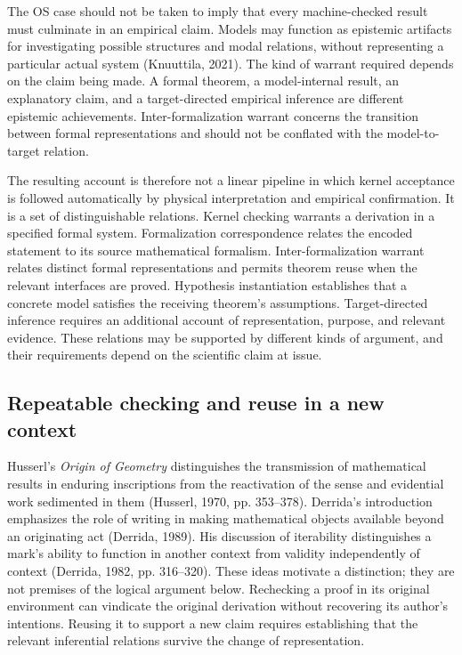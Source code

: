 \documentclass[pdflatex,sn-apa]{sn-jnl}
\begin{document}
The OS case should not be taken to imply that every machine-checked result must culminate in an empirical claim. Models may function as epistemic artifacts for investigating possible structures and modal relations, without representing a particular actual system (Knuuttila, 2021). The kind of warrant required depends on the claim being made. A formal theorem, a model-internal result, an explanatory claim, and a target-directed empirical inference are different epistemic achievements. Inter-formalization warrant concerns the transition between formal representations and should not be conflated with the model-to-target relation.

The resulting account is therefore not a linear pipeline in which kernel acceptance is followed automatically by physical interpretation and empirical confirmation. It is a set of distinguishable relations. Kernel checking warrants a derivation in a specified formal system. Formalization correspondence relates the encoded statement to its source mathematical formalism. Inter-formalization warrant relates distinct formal representations and permits theorem reuse when the relevant interfaces are proved. Hypothesis instantiation establishes that a concrete model satisfies the receiving theorem's assumptions. Target-directed inference requires an additional account of representation, purpose, and relevant evidence. These relations may be supported by different kinds of argument, and their requirements depend on the scientific claim at issue.

\subsection{Repeatable checking and reuse in a new context}

Husserl's \emph{Origin of Geometry} distinguishes the transmission of mathematical results in enduring inscriptions from the reactivation of the sense and evidential work sedimented in them (Husserl, 1970, pp. 353--378). Derrida's introduction emphasizes the role of writing in making mathematical objects available beyond an originating act (Derrida, 1989). His discussion of iterability distinguishes a mark's ability to function in another context from validity independently of context (Derrida, 1982, pp. 316--320). These ideas motivate a distinction; they are not premises of the logical argument below. Rechecking a proof in its original environment can vindicate the original derivation without recovering its author's intentions. Reusing it to support a new claim requires establishing that the relevant inferential relations survive the change of representation.
\end{document}
